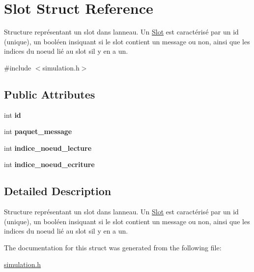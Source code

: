 \hypertarget{structSlot}{}\section{Slot Struct Reference}
\label{structSlot}


Structure représentant un slot dans l\textquotesingle{}anneau. Un \hyperlink{structSlot}{Slot} est caractérisé par un id (unique), un booléen insiquant si le slot contient un message ou non, ainsi que les indices du noeud lié au slot s\textquotesingle{}il y en a un.  




{\ttfamily \#include $<$simulation.\+h$>$}

\subsection*{Public Attributes}
\begin{DoxyCompactItemize}
\item 
int {\bfseries id}\hypertarget{structSlot_a32589d4e878e8be8965841a259eef8d6}{}\label{structSlot_a32589d4e878e8be8965841a259eef8d6}

\item 
int {\bfseries paquet\+\_\+message}\hypertarget{structSlot_a9b0a0958973c0d3b51813fac41492831}{}\label{structSlot_a9b0a0958973c0d3b51813fac41492831}

\item 
int {\bfseries indice\+\_\+noeud\+\_\+lecture}\hypertarget{structSlot_a166682445d344df3379dd303c79bcf33}{}\label{structSlot_a166682445d344df3379dd303c79bcf33}

\item 
int {\bfseries indice\+\_\+noeud\+\_\+ecriture}\hypertarget{structSlot_a10bbba6b430cf07af2aba7051bf111fa}{}\label{structSlot_a10bbba6b430cf07af2aba7051bf111fa}

\end{DoxyCompactItemize}


\subsection{Detailed Description}
Structure représentant un slot dans l\textquotesingle{}anneau. Un \hyperlink{structSlot}{Slot} est caractérisé par un id (unique), un booléen insiquant si le slot contient un message ou non, ainsi que les indices du noeud lié au slot s\textquotesingle{}il y en a un. 

The documentation for this struct was generated from the following file\+:\begin{DoxyCompactItemize}
\item 
\hyperlink{simulation_8h}{simulation.\+h}\end{DoxyCompactItemize}
